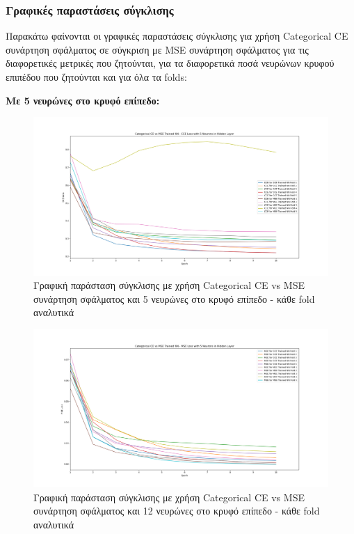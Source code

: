 \documentclass[12pt,a4paper]{article}
\begin{document}
\subsubsection{Γραφικές παραστάσεις σύγκλισης}

Παρακάτω φαίνονται οι γραφικές παραστάσεις σύγκλισης για χρήση Categorical CE συνάρτηση σφάλματος σε σύγκριση με MSE συνάρτηση σφάλματος για τις διαφορετικές μετρικές που ζητούνται, για τα διαφορετικά ποσά νευρώνων κρυφού επιπέδου που ζητούνται και για όλα τα folds:

\textbf{Με 5 νευρώνες στο κρυφό επίπεδο:}

\begin{figure}[H]
	\includegraphics[width=\textwidth]{Screenshots/1. CCE vs MSE - CCE Loss - 5 Neurons.png}
	\caption{Γραφική παράσταση σύγκλισης με χρήση Categorical CE vs MSE συνάρτηση σφάλματος και 5 νευρώνες στο κρυφό επίπεδο - κάθε fold αναλυτικά}
\end{figure}

\begin{figure}[H]
	\includegraphics[width=\textwidth]{Screenshots/2. CCE vs MSE - MSE Loss - 5 Neurons.png}
	\caption{Γραφική παράσταση σύγκλισης με χρήση Categorical CE vs MSE συνάρτηση σφάλματος και 12 νευρώνες στο κρυφό επίπεδο - κάθε fold αναλυτικά}
\end{figure}
\end{document}
